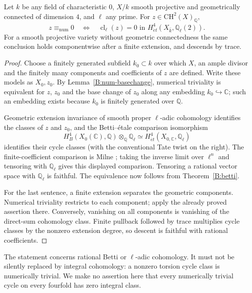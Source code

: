 \begin{theorem}\label{B:charzero}
Let $k$ be any field of characteristic $0$, $X/k$ smooth projective and geometrically connected of dimension $4$, and $\ell$ any prime. For $z\in\mathrm{CH}^2(X)_{\mathbb Q}$,
\[
 z\equiv_{\mathrm{num}}0
 \quad\Longleftrightarrow\quad
 \operatorname{cl}_\ell(z)=0\text{ in }H^4_{\acute et}(X_{\bar k},\mathbb Q_\ell(2)).
\]
For a smooth projective variety without geometric connectedness the same conclusion holds componentwise after a finite extension, and descends by trace.
\end{theorem}
\begin{proof}
Choose a finitely generated subfield $k_0\subset k$ over which $X$, an ample divisor and the finitely many components and coefficients of $z$ are defined. Write these models as $X_0,z_0$. By Lemma~\ref{B:num-basechange}, numerical triviality is equivalent for $z$, $z_0$ and the base change of $z_0$ along any embedding $k_0\hookrightarrow\mathbb C$; such an embedding exists because $k_0$ is finitely generated over $\mathbb Q$.

Geometric extension invariance of smooth proper $\ell$-adic cohomology identifies the classes of $z$ and $z_0$, and the Betti--\'{e}tale comparison isomorphism
\[
 H^4_B(X_0(\mathbb C),\mathbb Q)\otimes_{\mathbb Q}\mathbb Q_\ell
 \simeq H^4_{\acute et}(X_{0,\mathbb C},\mathbb Q_\ell)
\]
identifies their cycle classes (with the conventional Tate twist on the right). The finite-coefficient comparison is Milne \cite[Theorem 21.1]{BMilne2013}; taking the inverse limit over $\ell^n$ and tensoring with $\mathbb Q_\ell$ gives this displayed comparison. Tensoring a rational vector space with $\mathbb Q_\ell$ is faithful. The equivalence now follows from Theorem~\ref{B:betti}.

For the last sentence, a finite extension separates the geometric components. Numerical triviality restricts to each component; apply the already proved assertion there. Conversely, vanishing on all components is vanishing of the direct-sum cohomology class. Finite pullback followed by trace multiplies cycle classes by the nonzero extension degree, so descent is faithful with rational coefficients.
\end{proof}

\begin{remark}\label{B:integral}
The statement concerns rational Betti or $\ell$-adic cohomology. It must not be silently replaced by integral cohomology: a nonzero torsion cycle class is numerically trivial. We make no assertion here that every numerically trivial cycle on every fourfold has zero integral class.
\end{remark}

